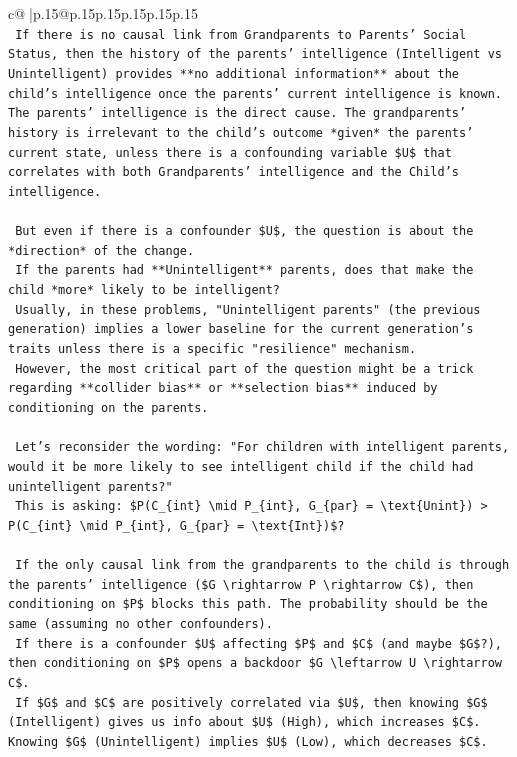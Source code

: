 \documentclass{article}
\begin{document}
{\begin{supertabular}{c@{$\;$}|p{.15\linewidth}@{}p{.15\linewidth}p{.15\linewidth}p{.15\linewidth}p{.15\linewidth}p{.15\linewidth}}
{{{\\ 
\texttt{    If there is no causal link from Grandparents to Parents' Social Status, then the history of the parents' intelligence (Intelligent vs Unintelligent) provides **no additional information** about the child's intelligence once the parents' current intelligence is known. The parents' intelligence is the direct cause. The grandparents' history is irrelevant to the child's outcome *given* the parents' current state, unless there is a confounding variable \$U\$ that correlates with both Grandparents' intelligence and the Child's intelligence.} \\
\\ 
\texttt{    But even if there is a confounder \$U\$, the question is about the *direction* of the change.} \\
\texttt{    If the parents had **Unintelligent** parents, does that make the child *more* likely to be intelligent?} \\
\texttt{    Usually, in these problems, "Unintelligent parents" (the previous generation) implies a lower baseline for the current generation's traits unless there is a specific "resilience" mechanism.} \\
\texttt{    However, the most critical part of the question might be a trick regarding **collider bias** or **selection bias** induced by conditioning on the parents.} \\
\\ 
\texttt{    Let's reconsider the wording: "For children with intelligent parents, would it be more likely to see intelligent child if the child had unintelligent parents?"} \\
\texttt{    This is asking: \$P(C\_\{int\} \textbackslash{}mid P\_\{int\}, G\_\{par\} = \textbackslash{}text\{Unint\}) > P(C\_\{int\} \textbackslash{}mid P\_\{int\}, G\_\{par\} = \textbackslash{}text\{Int\})\$?} \\
\\ 
\texttt{    If the only causal link from the grandparents to the child is through the parents' intelligence (\$G \textbackslash{}rightarrow P \textbackslash{}rightarrow C\$), then conditioning on \$P\$ blocks this path. The probability should be the same (assuming no other confounders).} \\
\texttt{    If there is a confounder \$U\$ affecting \$P\$ and \$C\$ (and maybe \$G\$?), then conditioning on \$P\$ opens a backdoor \$G \textbackslash{}leftarrow U \textbackslash{}rightarrow C\$.} \\
\texttt{    If \$G\$ and \$C\$ are positively correlated via \$U\$, then knowing \$G\$ (Intelligent) gives us info about \$U\$ (High), which increases \$C\$. Knowing \$G\$ (Unintelligent) implies \$U\$ (Low), which decreases \$C\$.} \\
}}}
\end{supertabular}}
\end{document}
